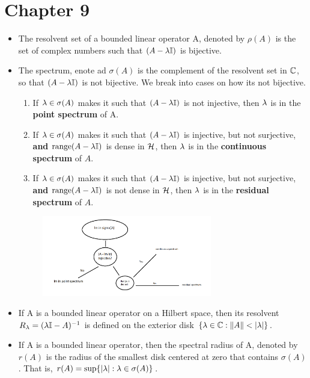 \section{Chapter 9}
\begin{itemize}
    \item The resolvent set of a bounded linear operator A, denoted by $\rho(A)$ is the set of complex numbers such that $(A - \mathrm{\lambda}\mathbb{I})$ is bijective. 

    \item The spectrum, enote ad $\sigma(A)$ is the complement of the resolvent set in $\mathbb{C}$, so that $(A - \mathrm{\lambda}\mathbb{I})$ is not bijective. We break into cases on how its not bijective.

    \begin{enumerate}
        \item If $\mathrm{\lambda} \in \sigma(A)$ makes it such that $(A - \mathrm{\lambda}\mathbb{I})$ is not injective, then $\mathrm{\lambda}$ is in the \textbf{point spectrum} of A.
        \item If $\mathrm{\lambda}\in \sigma(A)$ makes it such that $(A - \mathrm{\lambda}\mathbb{I})$ is injective, but not surjective, \textbf{and} $\text{range}(A - \mathrm{\lambda}\mathbb{I})$ is dense in $\mathcal{H}$, then $\mathrm{\lambda}$ is in the \textbf{continuous spectrum} of $A$.
        \item If $\mathrm{\lambda}\in \sigma(A)$ makes it such that $(A - \mathrm{\lambda}\mathbb{I})$ is injective, but not surjective, \textbf{and} $\text{range}(A - \mathrm{\lambda}\mathbb{I})$ is not dense in $\mathcal{H}$, then $\mathrm{\lambda}$ is in the \textbf{residual spectrum} of $A$.
    \end{enumerate}
    \begin{figure}[!h]
        \centering
        \includegraphics[width = 0.7\textwidth]{image.png}
    \end{figure}

    \item If A is a bounded linear operator on a Hilbert space, then its resolvent $R_{\mathrm{\lambda}} = (\mathrm{\lambda}\mathbb{I} - A)^{-1}$ is defined on the exterior disk $\{ \mathrm{\lambda} \in \mathbb{C} : \norm{A} < |\mathrm{\lambda}|\}$. 

    \item If A is a bounded linear operator, then the spectral radius of A, denoted by $r(A)$ is the radius of the smallest disk centered at zero that contains $\sigma(A)$. That is, $r(A) = \sup \{|\mathrm{\lambda}| : \mathrm{\lambda} \in \sigma(A)\}$. 


\end{itemize}
